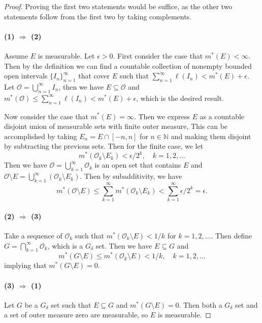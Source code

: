 \documentclass[../main.tex]{subfiles}
\begin{document}
\begin{proof}
  Proving the first two statements would be suffice, as the other two statements follow from the first two by taking complements.

  \paragraph{(1) $\Rightarrow$ (2)} Assume $E$ is measurable. Let $\epsilon > 0$. First consider the case that $m^*(E) < \infty$. Then by the definition we can find a countable collection of nonempty bounded open intervals $\{I_n\}_{n=1}^{\infty}$ that cover $E$ such that $\sum_{n=1}^{\infty} \ell(I_n) < m^*(E) + \epsilon$. Let $\mathcal{O} = \bigcup_{n=1}^{\infty} I_n$, then we have $E \subseteq \mathcal{O}$ and $m^*(\mathcal{O}) \leq \sum_{n=1}^{\infty} \ell(I_n) < m^*(E) + \epsilon$, which is the desired result.

  Now consider the case that $m^*(E) = \infty$. Then we express $E$ as a countable disjoint union of measurable sets with finite outer measure, This can be accomplished by taking $E_n = E \cap [-n, n]$ for $n \in \mathbb{N}$ and making them disjoint by subtracting the previous sets. Then for the finite case, we let
  \begin{equation*}
    m^*(\mathcal{O}_k \setminus E_k) < \epsilon/2^k, \quad k = 1, 2, \ldots
  \end{equation*}
  Then we have $\mathcal{O} = \bigcup_{k=1}^{\infty} \mathcal{O}_k$ is an open set that contains $E$ and $\mathcal{O} \setminus E = \bigcup_{k=1}^{\infty} (\mathcal{O}_k \setminus E_k)$. Then by subadditivity, we have
  \begin{equation*}
    m^*(\mathcal{O} \setminus E) \leq \sum_{k=1}^{\infty} m^*(\mathcal{O}_k \setminus E_k) < \sum_{k=1}^{\infty} \epsilon/2^k = \epsilon.
  \end{equation*}

  \paragraph{(2) $\Rightarrow$ (3)} Take a sequence of $\mathcal{O}_k$ such that $m^*(\mathcal{O}_k \setminus E) < 1/k$ for $k = 1, 2, \ldots$. Then define $G = \bigcap_{k=1}^{\infty} \mathcal{O}_k$, which is a $G_\delta$ set. Then we have $E \subseteq G$ and 
  \begin{equation*}
    m^*(G \setminus E) \leq m^*(\mathcal{O}_k \setminus E) < 1/k, \quad k = 1, 2, \ldots
  \end{equation*}
  implying that $m^*(G \setminus E) = 0$.

  \paragraph{(3) $\Rightarrow$ (1)} Let $G$ be a $G_\delta$ set such that $E \subseteq G$ and $m^*(G \setminus E) = 0$. Then both a $G_{\delta}$ set and a set of outer measure zero are measurable, so $E$ is measurable.
\end{proof}
\end{document}
